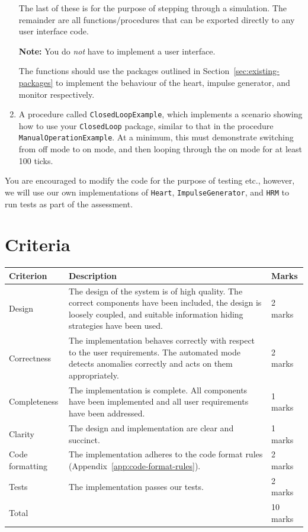 \documentclass[11pt]{article}
\begin{document}
\begin{enumerate}
  The last of these is for the purpose of stepping through a simulation. The remainder are all functions/procedures that can be exported directly to any user interface code. 

 \textbf{Note:} You do \emph{not} have to implement a user interface.

  The functions should use the packages outlined in Section~\ref{sec:existing-packages} to implement the behaviour of the heart, impulse generator, and monitor respectively. 

 \item A procedure called \texttt{ClosedLoopExample}, which implements a scenario showing how to use your \texttt{ClosedLoop} package, similar to that in the procedure \texttt{ManualOperationExample}. At a minimum, this must demonstrate switching from off mode to on mode, and then looping through the on mode for at least 100 ticks.

\end{enumerate}

You are encouraged to modify the code for the purpose of testing etc., however, we will use our own implementations of \texttt{Heart}, \texttt{ImpulseGenerator}, and \texttt{HRM} to run tests as part of the assessment.

\section{Criteria}

\begin{center}
\begin{tabular}{lp{10cm}l}
\toprule
 {\bf Criterion} & {\bf Description} & {\bf Marks}\\
\midrule
  Design & The design of the system is of high quality. The correct components have been included, the design is loosely coupled, and suitable information hiding strategies have been used. & 2 marks\\[2mm]
  Correctness & The implementation behaves correctly with respect to the user requirements. The automated mode detects anomalies correctly and acts on them appropriately.  & 2 marks\\[2mm]
  Completeness & The implementation is complete. All components have been implemented and all user requirements have been addressed. & 1 marks\\[2mm]
  Clarity & The design and implementation are clear and succinct. & 1 marks\\[2mm]
  Code formatting & The implementation adheres to the code format rules (Appendix~\ref{app:code-format-rules}). & 2 marks\\[2mm]
  Tests & The implementation passes our tests. & 2 marks\\[1mm]
\midrule
  Total && 10 marks\\
\bottomrule
\end{tabular}
\end{center}
\end{document}
